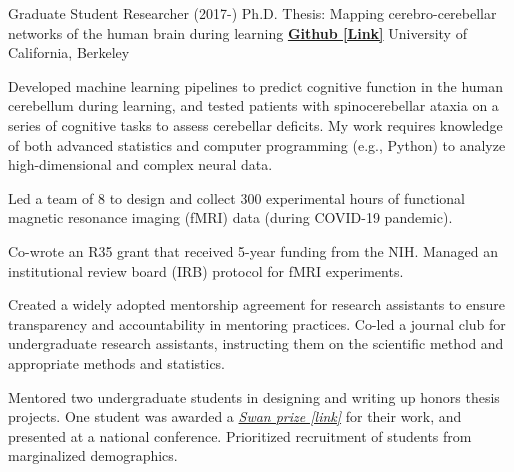 

\begin{cventries}

  \cventry
    {Graduate Student Researcher (2017-)} %
    {Ph.D. Thesis: Mapping cerebro-cerebellar networks of the human brain during learning}
    {\href{https://github.com/maedbhk/cerebellum_learning_connect}{\textbf{Github [Link]}}}
    {University of California, Berkeley} %
    {
      \begin{cvitems} %
        \item {Developed machine learning pipelines to predict cognitive function in the human cerebellum during learning, and tested patients with spinocerebellar ataxia on a series of cognitive tasks to assess cerebellar deficits. My work requires knowledge of both advanced statistics and computer programming (e.g., Python) to analyze high-dimensional and complex neural data.} 
        \item {Led a team of 8 to design and collect 300 experimental hours of functional magnetic resonance imaging (fMRI) data (during COVID-19 pandemic).}
        \item {Co-wrote an R35 grant that received 5-year funding from the NIH. Managed an institutional review board (IRB) protocol for fMRI experiments.}
        \item {Created a widely adopted mentorship agreement for research assistants to ensure transparency and accountability in mentoring practices. Co-led a journal club for undergraduate research assistants, instructing them on the scientific method and appropriate methods and statistics.}
        \item {Mentored two undergraduate students in designing and writing up honors thesis projects. One student was awarded a \href{https://psychology.berkeley.edu/sites/default/files/undergraduate-program/swanaward_application_2019-2020.pdf}{\textit{Swan prize [link]}} for their work, and presented at a national conference. Prioritized recruitment of students from marginalized demographics.}
      \end{cvitems}
    }
    

\end{cventries}
